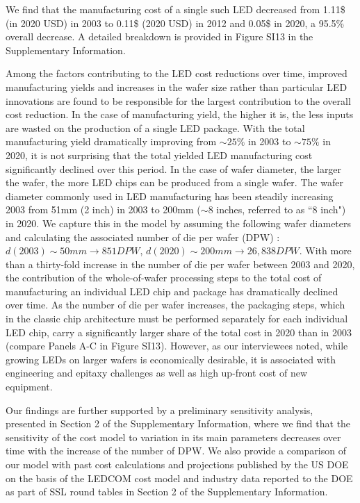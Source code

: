 \documentclass[journal=jacsat,manuscript=article]{achemso}
\begin{document}
 We find that the manufacturing cost of a single such LED decreased from 1.11\$ (in 2020 USD) in 2003 to 0.11\$ (2020 USD) in 2012 and 0.05\$ in 2020, a 95.5\% overall decrease. A detailed breakdown is provided in Figure SI13 in the Supplementary Information.

Among the factors contributing to the LED cost reductions over time, improved manufacturing yields and increases in the wafer size rather than particular LED innovations are found to be responsible for the largest contribution to the overall cost reduction. In the case of manufacturing yield, the higher it is, the less inputs are wasted on the production of a single LED package. With the total manufacturing yield dramatically improving from $\sim25\%$ in 2003 to $\sim75\%$ in 2020, it is not surprising that the total yielded LED manufacturing cost significantly declined over this period. In the case of wafer diameter, the larger the wafer, the more LED chips can be produced from a single wafer. The wafer diameter commonly used in LED manufacturing has been steadily increasing 2003 from 51mm (2 inch) in 2003 to 200mm ($\sim$8 inches, referred to as “8 inch") in 2020. We capture this in the model by assuming the following wafer diameters and calculating the associated number of die per wafer (DPW) \cite{de2005investigation}: $d(2003)\sim 50 mm \rightarrow851 DPW$, $d(2020)\sim200 mm \rightarrow 26,838 DPW$. With more than a thirty-fold increase in the number of die per wafer between 2003 and 2020, the contribution of the whole-of-wafer processing steps to the total cost of manufacturing an individual LED chip and package has dramatically declined over time. As the number of die per wafer increases, the packaging steps, which in the classic chip architecture must be performed separately for each individual LED chip, carry a significantly larger share of the total cost in 2020 than in 2003 (compare Panels A-C in Figure SI13). However, as our interviewees noted, while growing LEDs on larger wafers is economically desirable, it is associated with engineering and epitaxy challenges as well as high up-front cost of new equipment.

Our findings are further supported by a preliminary sensitivity analysis, presented in Section 2 of the Supplementary Information, where we find that the sensitivity of the cost model to variation in its main parameters decreases over time with the increase of the number of DPW. We also provide a comparison of our model with past cost calculations and projections published by the US DOE on the basis of the LEDCOM cost model\cite{ledcomv2} and industry data reported to the DOE as part of SSL round tables\cite{doe2010solid}\cite{doe2011solid}\cite{doe2012solid}\cite{doe2013solid}\cite{doe2014solid}\cite{doe2015solid}\cite{doe2016solid} in Section 2 of the Supplementary Information.
\end{document}

